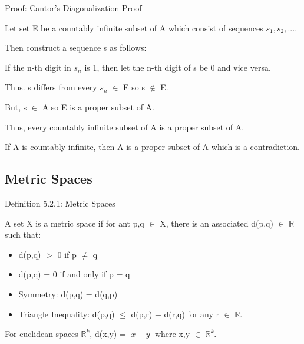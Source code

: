 { \color{magenta} \underline{Proof: Cantor's Diagonalization Proof} } 

	Let set E be a countably infinite subset of A which consist of sequences $s_1,s_2,...$.

	Then construct a sequence s as follows:

	\qquad If the n-th digit in $s_n$ is 1, then let the n-th digit of s be 0
	and vice versa.

	Thus. s differs from every $s_n$ $\in$ E so s $\not \in$ E.

	But, s $\in$ A so E is a proper subset of A.

	Thus, every countably infinite subset of A is a proper subset of A.

	If A is countably infinite, then A is a proper subset of A which
	is a contradiction.





\subsection{ Metric Spaces }

{ \color{blue} Definition 5.2.1: Metric Spaces } 

	\begin{adjustbox}{minipage=14cm, right, vspace=0.1cm 0cm}
		A set X is a metric space if for ant p,q $\in$ X, there is an associated d(p,q) $\in$
		$\mathbb{R}$ such that:	
		\begin{itemize}[leftmargin=1cm, itemsep=0.4em]
			\item d(p,q) $>$ 0 \qquad \qquad if p $\neq$ q
			
			\item d(p,q) = 0 if and only if p = q
			
			\item {\color{lblue} Symmetry}:
				d(p,q) = d(q,p)
			
			\item {\color{lblue} Triangle Inequality}:
				d(p,q) $\leq$ d(p,r) + d(r,q) \qquad \qquad for any r $\in$ $\mathbb{R}$.
		\end{itemize}

		For euclidean spaces $\mathbb{R}^k$, d(x,y) = $| x - y |$ where x,y $\in$ $\mathbb{R}^k$. \\
	\end{adjustbox}

